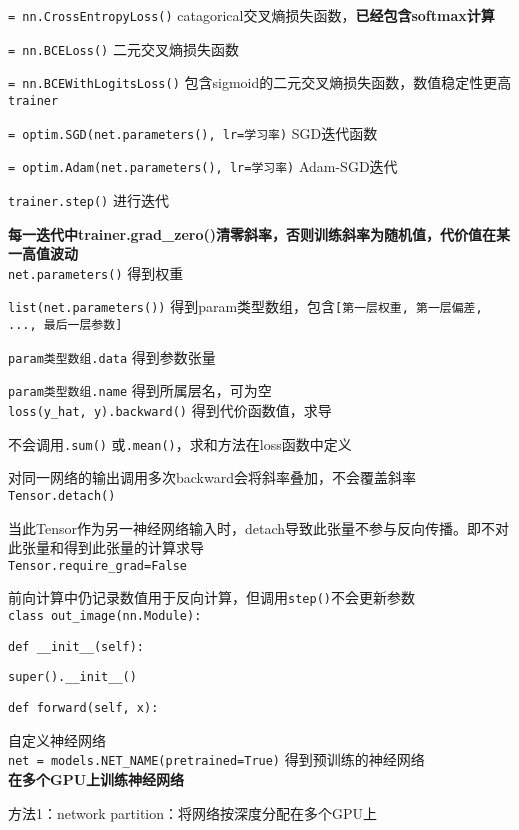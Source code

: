 \documentclass[UTF8]{ctexart}
\begin{document}
  \texttt{= nn.CrossEntropyLoss()} catagorical交叉熵损失函数，\textbf{已经包含softmax计算}
  
  \texttt{= nn.BCELoss()} 二元交叉熵损失函数
  
  \texttt{= nn.BCEWithLogitsLoss()} 包含sigmoid的二元交叉熵损失函数，数值稳定性更高\\
\texttt{trainer}

  \texttt{= optim.SGD(net.parameters(), lr=学习率)} SGD迭代函数

  \texttt{= optim.Adam(net.parameters(), lr=学习率)} Adam-SGD迭代

  \texttt{trainer.step()} 进行迭代
  
  \textbf{每一迭代中trainer.grad\_zero()清零斜率，否则训练斜率为随机值，代价值在某一高值波动}\\
\texttt{net.parameters()} 得到权重

  \texttt{list(net.parameters())} 得到param类型数组，包含\texttt{[第一层权重, 第一层偏差, ..., 最后一层参数]}
  
  \texttt{param类型数组.data} 得到参数张量
  
  \texttt{param类型数组.name} 得到所属层名，可为空\\
\texttt{loss(y\_hat, y).backward()} 得到代价函数值，求导

  不会调用\texttt{.sum()} 或\texttt{.mean()}，求和方法在loss函数中定义
  
  对同一网络的输出调用多次backward会将斜率叠加，不会覆盖斜率\\
\texttt{Tensor.detach()}

  当此Tensor作为另一神经网络输入时，detach导致此张量不参与反向传播。即不对此张量和得到此张量的计算求导\\
\texttt{Tensor.require\_grad=False}

  前向计算中仍记录数值用于反向计算，但调用\texttt{step()}不会更新参数\\
\texttt{class out\_image(nn.Module):}

  \texttt{def \_\_init\_\_(self):}

  \quad \texttt{super().\_\_init\_\_()}

  \texttt{def forward(self, x):}

  \quad 自定义神经网络\\
\texttt{net = models.NET\_NAME(pretrained=True)} 得到预训练的神经网络\\
\textbf{在多个GPU上训练神经网络}

  方法1：network partition：将网络按深度分配在多个GPU上
\end{document}
